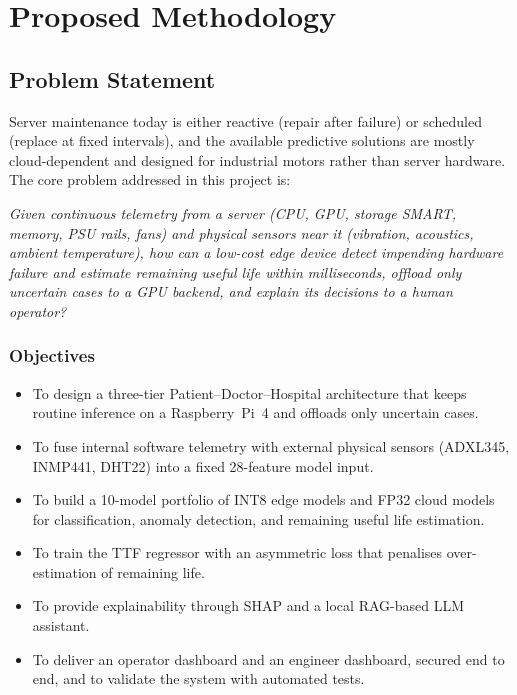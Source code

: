 \documentclass[12pt,a4paper]{report}
\begin{document}
\clearpage

\chapter{Proposed Methodology}

\section{Problem Statement}

Server maintenance today is either reactive (repair after failure) or scheduled (replace at fixed intervals), and the available predictive solutions are mostly cloud-dependent and designed for industrial motors rather than server hardware. The core problem addressed in this project is:

\textit{Given continuous telemetry from a server (CPU, GPU, storage SMART, memory, PSU rails, fans) and physical sensors near it (vibration, acoustics, ambient temperature), how can a low-cost edge device detect impending hardware failure and estimate remaining useful life within milliseconds, offload only uncertain cases to a GPU backend, and explain its decisions to a human operator?}

\subsection*{Objectives}
\begin{itemize}
  \item To design a three-tier Patient--Doctor--Hospital architecture that keeps routine inference on a Raspberry~Pi~4 and offloads only uncertain cases.
  \item To fuse internal software telemetry with external physical sensors (ADXL345, INMP441, DHT22) into a fixed 28-feature model input.
  \item To build a 10-model portfolio of INT8 edge models and FP32 cloud models for classification, anomaly detection, and remaining useful life estimation.
  \item To train the TTF regressor with an asymmetric loss that penalises over-estimation of remaining life.
  \item To provide explainability through SHAP and a local RAG-based LLM assistant.
  \item To deliver an operator dashboard and an engineer dashboard, secured end to end, and to validate the system with automated tests.
\end{itemize}
\end{document}
